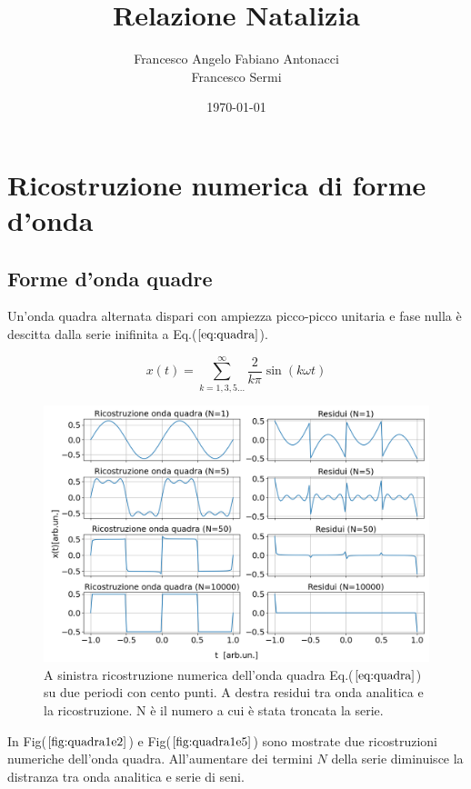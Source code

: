 \documentclass{article}
\author{Francesco Angelo Fabiano Antonacci\\Francesco Sermi}
\date{\today}
\title{Relazione Natalizia}
\begin{document}
\maketitle

\section{Ricostruzione numerica di forme d'onda}
    \subsection{Forme d'onda quadre}
    \label{sez:quadra}
        Un'onda quadra alternata dispari con ampiezza picco-picco unitaria e fase 
        nulla è descitta dalla serie inifinita a Eq.($\ref{eq:quadra}$).

        \begin{equation}
            x(t) = \sum_{k=1,3,5...}^{\infty} \frac{2}{k\pi}\sin\left(k\omega t\right)
            \label{eq:quadra}
        \end{equation}


        \begin{figure}[htbp]
            \centering
            \includegraphics[width=1\textwidth]{fousquarewave1e2.png} %
            \caption{A sinistra ricostruzione numerica dell'onda quadra Eq.($\ref{eq:quadra}$) su
                    due periodi con cento punti.
                    A destra residui tra onda analitica e la ricostruzione.
                    N è il numero a cui è stata troncata la serie.}
            \label{fig:quadra1e2}
        \end{figure}

        \noindent In Fig($\ref{fig:quadra1e2}$) e Fig($\ref{fig:quadra1e5}$) sono mostrate due ricostruzioni
        numeriche dell'onda quadra.
        All'aumentare dei termini $N$ della serie diminuisce la distranza tra onda analitica e serie 
        di seni.
\end{document}

